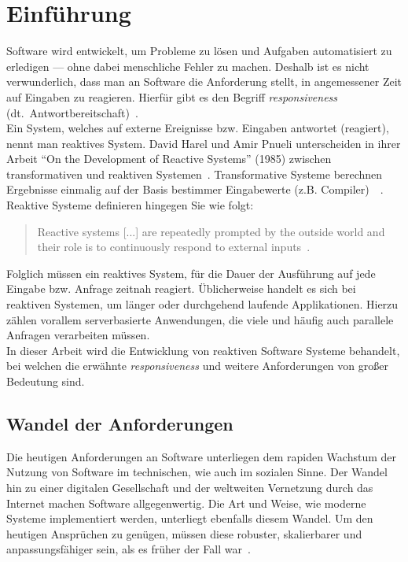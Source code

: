 \chapter{Einführung}\label{sec:einfuehrung}
Software wird entwickelt, um Probleme zu lösen und Aufgaben automatisiert zu erledigen --- ohne dabei menschliche Fehler zu machen. Deshalb ist es nicht verwunderlich, dass man an Software die Anforderung stellt, in angemessener Zeit auf Eingaben zu reagieren. Hierfür gibt es den Begriff \textit{responsiveness} (dt.\ Antwortbereitschaft)~\cite[S.~18]{kuhn_reactive_2015}.\\
Ein System, welches auf externe Ereignisse bzw. Eingaben antwortet (reagiert), nennt man reaktives System. David Harel und Amir Pnueli unterscheiden in ihrer Arbeit \enquote{On the Development of Reactive Systems} (1985) zwischen transformativen und reaktiven Systemen~\cite{harel_development_1985}. Transformative Systeme berechnen Ergebnisse einmalig auf der Basis bestimmer Eingabewerte (z.B. Compiler)~\cite[S.~2]{carkci_dataflow_2014}~\cite{wieringa_design_2003}. Reaktive Systeme definieren hingegen Sie wie folgt:

\begin{quotation}
  Reactive systems [...] are repeatedly prompted by the outside world and their role is to continuously respond to external inputs~\cite{harel_development_1985}.
\end{quotation}

Folglich müssen ein reaktives System, für die Dauer der Ausführung auf jede Eingabe bzw. Anfrage zeitnah reagiert. Üblicherweise handelt es sich bei reaktiven Systemen, um länger oder durchgehend laufende Applikationen. Hierzu zählen vorallem serverbasierte Anwendungen, die viele und häufig auch parallele Anfragen verarbeiten müssen.\\
In dieser Arbeit wird die Entwicklung von reaktiven Software Systeme behandelt, bei welchen die erwähnte \textit{responsiveness} und weitere Anforderungen von großer Bedeutung sind.

\pagebreak

\section{Wandel der Anforderungen}
Die heutigen Anforderungen an Software unterliegen dem rapiden Wachstum der Nutzung von Software im technischen, wie auch im sozialen Sinne. Der Wandel hin zu einer digitalen Gesellschaft und der weltweiten Vernetzung durch das Internet machen Software allgegenwertig. Die Art und Weise, wie moderne Systeme implementiert werden, unterliegt ebenfalls diesem Wandel. Um den heutigen Ansprüchen zu genügen, müssen diese robuster, skalierbarer und anpassungsfähiger sein, als es früher der Fall war~\cite{boner_reactive_2014}.\\

